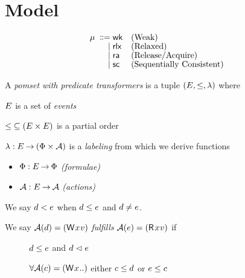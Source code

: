 \section{Model}


\begin{align*}
  \mu \;\mathrel{\mathord{\vcentcolon}\mkern-1mu\mathord{\vcentcolon}\mathord{{=}}}\;& {\mathsf{wk}} &&\text{{(Weak)}}
  \\[-1ex] \;\mathrel{|}\;& {\mathsf{rlx}} &&\text{{(Relaxed)}}
  \\[-1ex] \;\mathrel{|}\;& {\mathsf{ra}} &&\text{{(Release/Acquire)}}
  \\[-1ex] \;\mathrel{|}\;& {\mathsf{sc}} &&\text{{(Sequentially Consistent)}}    
\end{align*}

\begin{definition}
  A \emph{pomset with predicate transformers} is a tuple
  $(E, {\le}, \lambda)$ where
  \begin{description}
  \item $E$ is a set of \emph{events}
  \item
    ${\le} \subseteq (E\times E)$ is a partial order
  \item
    $\lambda: E \mathbin\rightarrow (\Phi\times\mathcal{A})$ is a \emph{labeling} from
    which we derive functions
    \begin{itemize}
    \item $\Phi:E\mathbin\rightarrow\Phi$
      \emph{(formulae)} %
    \item $\mathcal{A}:E\mathbin\rightarrow\mathcal{A}$
      \emph{(actions)} %
    \end{itemize}
  \end{description}
\end{definition}
We say $d<e$ when $d\le e$ and $d\neq e$.
\begin{definition}
  We say $\labelingAct(\bEv)=(\DW[]{x}{v})$ \emph{fulfills}
  $\labelingAct(\aEv)=(\DR[]{x}{v})$ if
  \begin{description}
  \item[{}] $d \le e$ and
    $d \vartriangleleft e$
  \item[{}]
    $\forall\labelingAct(\cEv)=(\DW[]{x}{..})$ either $c \le d$ or
    $e \le c$
  \end{description}  
\end{definition}

